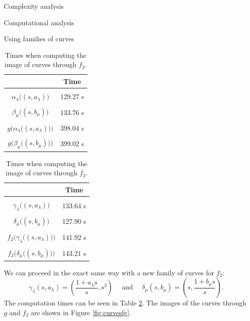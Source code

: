 \documentclass[11pt, a4paper, english, twoside, notitlepage, openright]{report}
\begin{document}
\begin{chapter}{Complexity analysis}
\begin{section}{Computational analysis}
\begin{subsection}{Using families of curves}
\begin{table}[ht!]
\parbox{.45\linewidth}{
\centering
\begin{tabular}{c || c }
 & Time  \\ \hline \hline
\\[-1em]
$\alpha_{\lambda}\big((s, a_\lambda)\big)$ &  129.27 s\\ \hline
\\[-1em]
$\beta_{\mu}\big((s, b_\mu)\big)$ &133.76 s \\ \hline
\\[-1em]
$g\big(\alpha_{\lambda}\big((s, a_\lambda)\big)\big)$ & 398.04 s  \\ \hline
\\[-1em]
$g\big(\beta_{\mu}\big((s, b_\mu)\big)\big)$ & 399.02 s \\
\end{tabular}
\caption[]{Times when computing the image of curves through $g$.}\label{tab:curves1}
}
\hfill
\parbox{.45\linewidth}{
\centering
\begin{tabular}{c || c }
 & Time  \\ \hline \hline
\\[-1em]
$\gamma_{\lambda}\big((s, a_\lambda)\big)$ & 133.64 s \\ \hline
\\[-1em]
$\delta_{\mu}\big((s, b_\mu)\big)$ &127.90 s \\ \hline
\\[-1em]
$f_2\big(\gamma_{\lambda}\big((s, a_\lambda)\big)\big)$ & 141.92 s  \\ \hline
\\[-1em]
$f_2\big(\delta_{\mu}\big((s, b_\mu)\big)\big)$ & 143.21 s \\
\end{tabular}
\caption[]{Times when computing the image of curves through $f_2$.}\label{tab:curves3}
}
\end{table}

We can proceed in the exact same way with a new family of curves for $f_2$:
$$
\gamma_\lambda(s, a_\lambda) = \left(\frac{1+a_\lambda s}{s}, s^2\right)
\quad \text{ and } \quad
\delta_\mu(s, b_\mu) = \left(s, \frac{1+b_\mu s}{s}\right).
$$
The computation times can be seen in Table \ref{tab:curves3}. The images of the curves through $g$ and $f_2$ are shown in Figure \ref{fig:curvesfg}.


\end{subsection}
\end{section}
\end{chapter}
\end{document}
